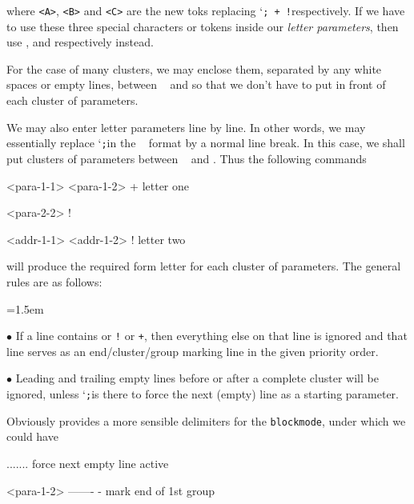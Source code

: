 {\setraw
\unsetraw

where {\tt <A>}, {\tt <B>} and {\tt <C>} are the new toks
replacing \lq{\tt ; + !}\rqs respectively. If we have to use
these three special characters or tokens inside our {\sl letter
parameters}, then use {\tt \string\pstr}, {\tt\string\gstr} and
{\tt\string\cstr} respectively instead.

\medskip

For the case of many clusters, we may enclose them, separated by
any white spaces or empty lines, between {\tt
\string\beginpilemode} and {\tt \string\endpilemode} so that we
don't have to put {\tt \string\moreletter} in front of each
cluster of parameters.


\medskip
We may also enter letter parameters line by line. In other words,
we may essentially replace \lq{\tt;}\rqs in the {\tt
\string\moreletter} format by a normal line break. In this case,
we shall put  clusters of parameters between {\tt
\string\beginblockmode} and {\tt \string\endblockmode}.  Thus the
following commands


\setraw
  \beginblockmode
     <para-1-1>
     <para-1-2>
       +       letter one

     <para-2-2>
       !

     <addr-1-1>
     <addr-1-2>
       !       letter two
  \endblockmode
\unsetraw


will produce the required form letter for each cluster of
parameters. The general rules are as follows:

{\parindent=1.5em
\item{$\bullet$} If a line contains {\tt \string\endblockmode} or {\tt !}
or {\tt +}, then everything else on that line is ignored and that
line serves as an end/cluster/group marking line in the given
priority order.

\item{$\bullet$} Leading and trailing empty lines before or after
a complete cluster will be ignored, unless \lq{\tt ;}\rqs is
there to force the next (empty) line as a starting parameter.
\par }

Obviously {\tt \string\blockmarks} provides a more sensible
delimiters for the {\tt blockmode}, under which we could have

\setraw
  \blockmarks\beginblockmode
    .......    force next empty line active

   <para-1-2>
   ------- -  mark end of 1st group

}
